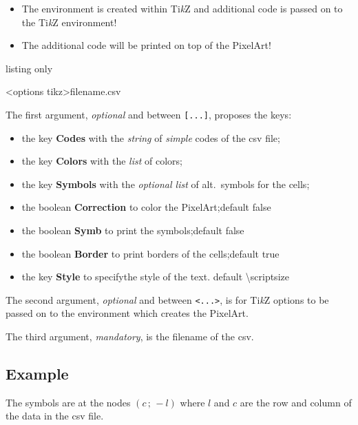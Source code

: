 \documentclass{article}
\newcommand\Cle[1]{{\bfseries\sffamily\textlangle #1\textrangle}}
\begin{document}
\begin{itemize}
	\item The environment is created within Ti\textit{k}Z and additional code is passed on to the Ti\textit{k}Z environment!
	\item The additional code will be printed on top of the PixelArt!
\end{itemize}

\begin{PresentationCode}{listing only}
\begin{EnvPixlArtTikz}[keys]<options tikz>{filename.csv}
\end{EnvPixlArtTikz}
\end{PresentationCode}

The first argument, \textit{optional} and between \texttt{[...]}, proposes the \textsf{keys}:

\begin{itemize}
	\item the key \Cle{Codes} with the \textit{string} of \textit{simple} codes of the \textsf{csv} file;
	\item the key \Cle{Colors} with the \textit{list} of colors;
	\item the key \Cle{Symbols} with the \textit{optional list} of alt.\ symbols for the cells;
	\item the boolean \Cle{Correction} to color the PixelArt;\hfill{}default \textsf{false}
	\item the boolean \Cle{Symb} to print the symbols;\hfill{}default \textsf{false}
	\item the boolean \Cle{Border} to print borders of the cells;\hfill{}default \textsf{true}
	\item the key \Cle{Style} to specifythe style of the text. \hfill{}default \textsf{\textbackslash scriptsize}
\end{itemize}

The second argument, \textit{optional} and between \texttt{<...>}, is for Ti\textit{k}Z options to be passed on to the environment which creates the PixelArt.

\medskip

The third argument, \textit{mandatory}, is the filename of the \textsf{csv}.

\subsection{Example}

The symbols are at the nodes $(c\,;\,-l)$ where $l$ and $c$ are the row and column  of the data in the \textsf{csv} file.
\end{document}

